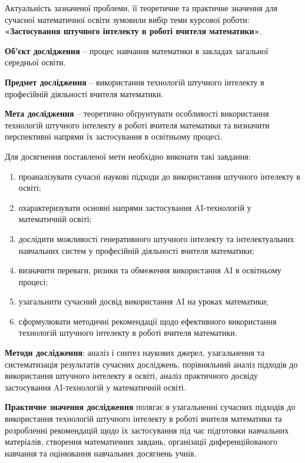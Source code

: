 Актуальність зазначеної проблеми, її теоретичне та практичне значення для сучасної математичної освіти зумовили вибір теми курсової роботи: \textbf{«Застосування штучного інтелекту в роботі вчителя математики»}.

\textbf{Об'єкт дослідження} – процес навчання математики в закладах загальної середньої освіти.

\textbf{Предмет дослідження} – використання технологій штучного інтелекту в професійній діяльності вчителя математики.

\textbf{Мета дослідження} – теоретично обґрунтувати особливості використання технологій штучного інтелекту в роботі вчителя математики та визначити перспективні напрями їх застосування в освітньому процесі.

Для досягнення поставленої мети необхідно виконати такі завдання:

\begin{enumerate}
\item проаналізувати сучасні наукові підходи до використання штучного інтелекту в освіті;
\item охарактеризувати основні напрями застосування AI-технологій у математичній освіті;
\item дослідити можливості генеративного штучного інтелекту та інтелектуальних навчальних систем у професійній діяльності вчителя математики;
\item визначити переваги, ризики та обмеження використання AI в освітньому процесі;
\item узагальнити сучасний досвід використання AI на уроках математики;
\item сформулювати методичні рекомендації щодо ефективного використання технологій штучного інтелекту в роботі вчителя математики.
\end{enumerate}

\textbf{Методи дослідження}: аналіз і синтез наукових джерел, узагальнення та систематизація результатів сучасних досліджень, порівняльний аналіз підходів до використання штучного інтелекту в освіті, аналіз практичного досвіду застосування AI-технологій у математичній освіті.

\textbf{Практичне значення дослідження} полягає в узагальненні сучасних підходів до використання технологій штучного інтелекту в роботі вчителя математики та розробленні рекомендацій щодо їх застосування під час підготовки навчальних матеріалів, створення математичних завдань, організації диференційованого навчання та оцінювання навчальних досягнень учнів.

